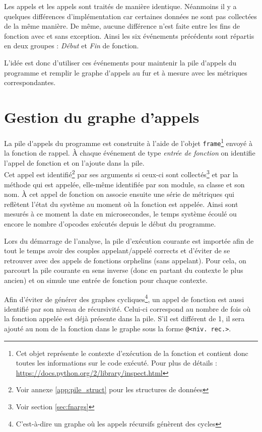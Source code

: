 Les appels \C et les appels \Python sont traités de manière identique. Néanmoins il y a quelques différences d'implémentation car certaines données ne sont pas collectées de la même manière. De même, aucune différence n'est faite entre les fins de fonction avec et sans exception. Ainsi les six événements précédents sont répartis en deux groupes : \emph{Début} et \emph{Fin} de fonction.

L'idée est donc d'utiliser ces événements pour maintenir la \gls{pile d'appels} du programme et remplir le \gls{graphe d'appels} au fur et à mesure avec les métriques correspondantes.

  \section{Gestion du graphe d'appels}
  \label{sec:gestion-graph-appels}
La \gls{pile d'appels} du programme est construite à l'aide de l'objet \verb|frame|\footnote{Cet objet représente le contexte d'exécution de la fonction et contient donc toutes les informations sur le code exécuté. Pour plus de détails : \url{https://docs.python.org/2/library/inspect.html}} envoyé à la fonction de rappel. À chaque événement de type \emph{entrée de fonction} on identifie l'appel de fonction et on l'ajoute dans la pile. \\  
Cet appel est identifié\footnote{Voir annexe \vref{app:pile_struct} pour les structures de données} par ses arguments si ceux-ci sont collectés\footnote{Voir section \vref{sec:fnargs}} et par la méthode qui est appelée, elle-même identifiée par son module, sa classe et son nom. À cet appel de fonction on associe ensuite une série de métriques qui reflètent l'état du système au moment où la fonction est appelée. Ainsi sont mesurés à ce moment la date en microsecondes, le temps système écoulé ou encore le nombre d'opcodes exécutés depuis le début du programme.

\begin{note}
Lors du démarrage de l'analyse, la pile d'exécution courante est importée afin de tout le temps avoir des couples appelant/appelé corrects et d'éviter de se retrouver avec des appels de fonctions orphelins (sans appelant). Pour cela, on parcourt la pile courante en sens inverse (donc en partant du contexte le plus ancien) et on simule une entrée de fonction pour chaque contexte.
\end{note}

\begin{note} 
Afin d'éviter de générer des graphes cycliques\footnote{C'est-à-dire un graphe où les appels récursifs génèrent des cycles}, un appel de fonction est aussi identifié par son niveau de récursivité. Celui-ci correspond au nombre de fois où la fonction appelée est déjà présente dans la pile. S'il est différent de 1, il sera ajouté au nom de la fonction dans le graphe sous la forme \verb|@<niv. rec.>|.
\end{note}

